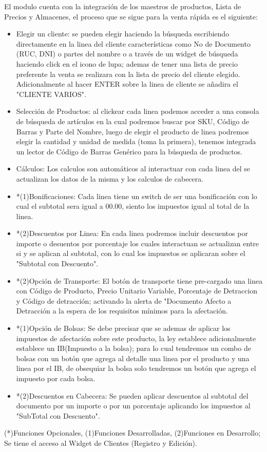 \documentclass[pdftex,12pt,oneside,a4paper,spanish, english, brazil]{abntex2}
\begin{document}
\begin{sloppypar}
              El modulo cuenta con la integración de los maestros de productos, Lista de Precios y Almacenes, el proceso que se sigue para la venta rápida es el siguiente:
              \begin{itemize}
              	\item Elegir un cliente: se pueden elegir haciendo la búsqueda escribiendo directamente en la linea del cliente características como No de Documento (RUC, DNI) o partes del nombre o a través de un widget de búsqueda haciendo click en el icono de lupa; ademas de tener una lista de precio preferente la venta se realizara con la lista de precio del cliente elegido.\\
              	Adicionalmente al hacer ENTER sobre la linea de cliente
              	se añadira el "CLIENTE VARIOS".
              	\item Selección de Productos: al clickear cada linea podemos acceder a una consola de búsqueda de artículos en la cual podremos buscar por SKU, Código de Barras y Parte del Nombre, luego de elegir el producto de linea podremos elegir la cantidad y unidad de medida (toma la primera), tenemos integrada un lector de Código de Barras Genérico para la búsqueda de productos.
              	\item Cálculos: Los calculos son automáticos al interactuar con cada linea del se actualizan los datos de la misma y los calculos de cabecera.
              	\item *(1)Bonificaciones: Cada linea tiene un switch de ser una bonificación con lo cual el subtotal sera igual a 00.00, siento los impuestos igual al total de la linea.
              	\item *(2)Descuentos por Linea: En cada linea podremos incluir descuentos por importe o desuentos por porcentaje los cuales interactuan se actualizan entre si y se aplican al subtotal, con lo cual los impuestos se aplicaran sobre el "Subtotal con Descuento".
              	\item *(2)Opción de Transporte: El botón de transporte tiene pre-cargado una linea con Código de Producto, Precio Unitario Variable, Porcentaje de Detraccion y Código de detracción; activando la alerta de "Documento Afecto a Detracción a la espera de los requisitos mínimos para la afectación.
              	\item *(1)Opción de Bolsas: Se debe precisar que se ademas de aplicar los impuestos de afectación sobre este producto, la ley establece adicionalmente establece un IB(Impuesto a la bolsa); para lo cual tendremos un combo de bolsas con un botón que agrega al detalle una linea por el producto y
              	una linea  por el IB, de obsequiar la bolsa solo tendremos un botón que agrega el impuesto
              	por cada bolsa.
              	\item *(2)Descuentos en Cabecera: Se pueden aplicar descuentos al subtotal del documento por un importe o por un porcentaje aplicando los impuestos al "SubTotal con Descuento".
              \end{itemize}
          		(*)Funciones Opcionales, (1)Funciones Desarrolladas, (2)Funciones en Desarrollo; Se tiene el acceso al Widget de Clientes (Registro y Edición).

\end{sloppypar}
\end{document}
